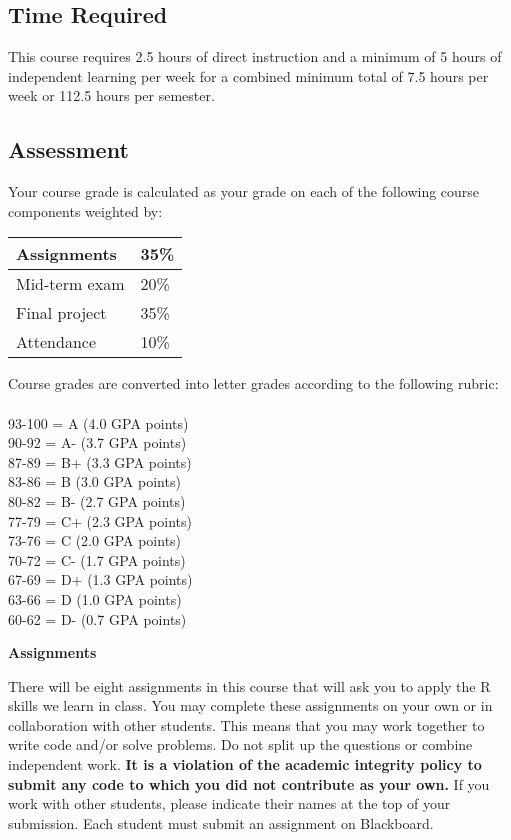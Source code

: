 \documentclass[12pt,letterpaper]{article}
\begin{document}
\subsection*{Time Required}

This course requires 2.5 hours of direct instruction and a minimum of 5 hours of independent learning per week for a combined minimum total of 7.5 hours per week or 112.5 hours per semester.

\subsection*{Assessment}

Your course grade is calculated as your grade on each of the following course components weighted by:

\begin{tabular}{l|l}
Assignments & 35\% \\
\hline
Mid-term exam & 20\% \\
\hline
Final project & 35\% \\
\hline
Attendance & 10\%
\end{tabular}
\newpage
Course grades are converted into letter grades according to the following rubric:\\
\\
93-100 = A (4.0 GPA points)\\
90-92 = A- (3.7 GPA points)\\
87-89 = B+ (3.3 GPA points)\\
83-86 = B (3.0 GPA points)\\
80-82 = B- (2.7 GPA points)\\
77-79 = C+ (2.3 GPA points)\\
73-76 = C (2.0 GPA points)\\
70-72 = C- (1.7 GPA points)\\
67-69 = D+ (1.3 GPA points)\\
63-66 = D (1.0 GPA points) \\
60-62 = D- (0.7 GPA points)

\textbf{Assignments}

There will be eight assignments in this course that will ask you to apply the R skills we learn in class. You may complete these assignments on your own or in collaboration with other students. This means that you may work together to write code and/or solve problems. Do not split up the questions or combine independent work. \textbf{It is a violation of the academic integrity policy to submit any code to which you did not contribute as your own.} If you work with other students, please indicate their names at the top of your submission. Each student must submit an assignment on Blackboard. \par
\end{document}
